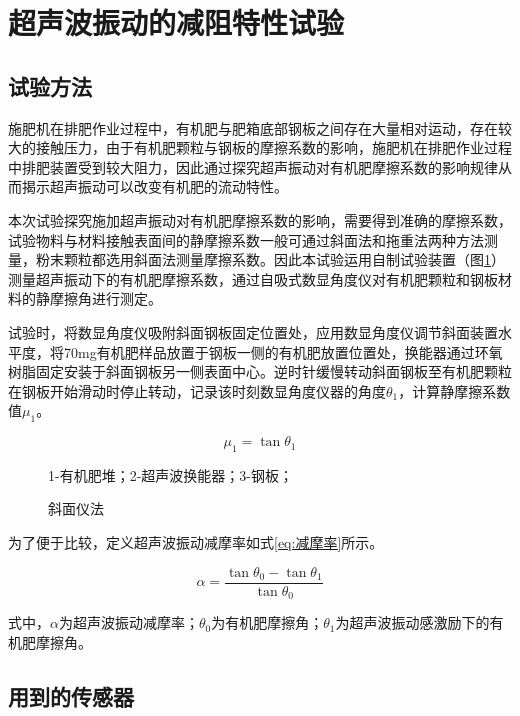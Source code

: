 \section{超声波振动的减阻特性试验}

\subsection{试验方法}

施肥机在排肥作业过程中，有机肥与肥箱底部钢板之间存在大量相对运动，存在较大的接触压力，由于有机肥颗粒与钢板的摩擦系数的影响，施肥机在排肥作业过程中排肥装置受到较大阻力，因此通过探究超声振动对有机肥摩擦系数的影响规律从而揭示超声振动可以改变有机肥的流动特性。

本次试验探究施加超声振动对有机肥摩擦系数的影响，需要得到准确的摩擦系数，试验物料与材料接触表面间的静摩擦系数一般可通过斜面法和拖重法两种方法测量，粉末颗粒都选用斜面法测量摩擦系数。因此本试验运用自制试验装置（图\ref{pic:斜面仪法}）测量超声振动下的有机肥摩擦系数，通过自吸式数显角度仪对有机肥颗粒和钢板材料的静摩擦角进行测定。

试验时，将数显角度仪吸附斜面钢板固定位置处，应用数显角度仪调节斜面装置水平度，将70mg有机肥样品放置于钢板一侧的有机肥放置位置处，换能器通过环氧树脂固定安装于斜面钢板另一侧表面中心。逆时针缓慢转动斜面钢板至有机肥颗粒在钢板开始滑动时停止转动，记录该时刻数显角度仪器的角度$\theta_1$，计算静摩擦系数值$\mu_1$。

\begin{equation}
	\mu_1 = \tan {\theta_1} \label{eq:静摩擦系数}
\end{equation}

\begin{figure}[H]
	\centering
	

	{\small 1-有机肥堆；2-超声波换能器；3-钢板；}
	\caption{斜面仪法}
	\label{pic:斜面仪法}
\end{figure}

为了便于比较，定义超声波振动减摩率如式\eqref{eq:减摩率}所示。

\begin{equation}
	\alpha = \frac{\tan{\theta_0}-\tan{\theta_1}}{\tan{\theta_0}} \label{eq:减摩率}
\end{equation}

式中，$\alpha$为超声波振动减摩率；$\theta_0$为有机肥摩擦角；$\theta_1$为超声波振动感激励下的有机肥摩擦角。

\subsection{用到的传感器}

